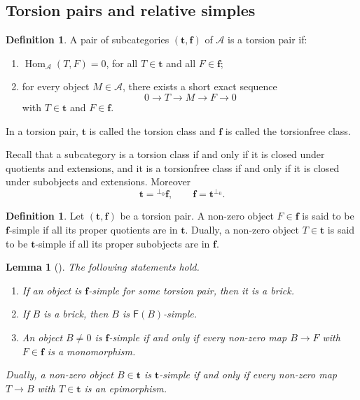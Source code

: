 \documentclass[11pt]{amsart}
\newtheorem{lemma}[theorem]{Lemma}
\theoremstyle{definition}
\newtheorem{definition}[theorem]{Definition}
\newcommand{\A}{\mathcal A}
\newcommand{\F}{\mathsf F}
\newcommand{\Hom}{\operatorname{Hom}}
\begin{document}
\subsection{Torsion pairs and relative simples}

\begin{definition}
A pair of subcategories \((\mathbf t,\mathbf f)\) of \(\A\) is a torsion pair if:
\begin{enumerate}[label=\textup{(\arabic*)},leftmargin=2.5em]
\item \(\Hom_\A(T,F)=0\), for all \(T\in\mathbf t\) and all \(F\in\mathbf f\);
\item for every object \(M\in\A\), there exists a short exact sequence
\[
0\longrightarrow T\longrightarrow M\longrightarrow F\longrightarrow 0
\]
with \(T\in\mathbf t\) and \(F\in\mathbf f\).
\end{enumerate}
In a torsion pair, \(\mathbf t\) is called the torsion class and \(\mathbf f\) is called the torsionfree class.
\end{definition}

Recall that a subcategory is a torsion class if and only if it is closed under quotients and extensions, and it is a torsionfree class if and only if it is closed under subobjects and extensions. Moreover
\[
\mathbf t={}^{\perp_0}\mathbf f,
\qquad
\mathbf f=\mathbf t^{\perp_0}.
\]

\begin{definition}
Let \((\mathbf t,\mathbf f)\) be a torsion pair. A non-zero object \(F\in\mathbf f\) is said to be \(\mathbf f\)-simple if all its proper quotients are in \(\mathbf t\). Dually, a non-zero object \(T\in\mathbf t\) is said to be \(\mathbf t\)-simple if all its proper subobjects are in \(\mathbf f\).
\end{definition}

\begin{lemma}[{\cite{EnomotoMonobrick}}]\label{lem:relative-simple-brick}
The following statements hold.
\begin{enumerate}[label=\textup{(\arabic*)},leftmargin=2.5em]
\item If an object is \(\mathbf f\)-simple for some torsion pair, then it is a brick.
\item If \(B\) is a brick, then \(B\) is \(\F(B)\)-simple.
\item An object \(B\neq 0\) is \(\mathbf f\)-simple if and only if every non-zero map \(B\to F\) with \(F\in\mathbf f\) is a monomorphism.
\end{enumerate}
Dually, a non-zero object \(B\in\mathbf t\) is \(\mathbf t\)-simple if and only if every non-zero map \(T\to B\) with \(T\in\mathbf t\) is an epimorphism.
\end{lemma}
\end{document}
